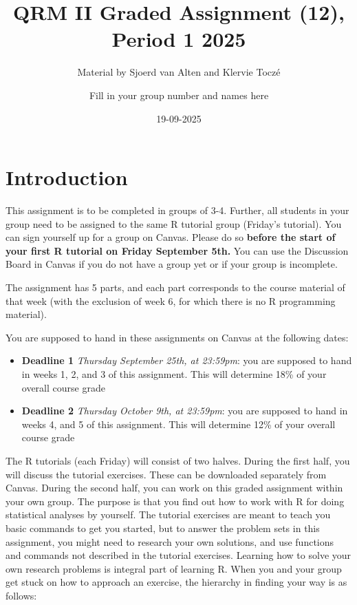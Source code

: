 \documentclass[
]{article}
\title{QRM II Graded Assignment (12), Period 1 2025}
\subtitle{Material by Sjoerd van Alten and Klervie Toczé}
\author{Fill in your group number and names here}
\date{19-09-2025}
\providecommand{\tightlist}{%
  \setlength{\itemsep}{0pt}\setlength{\parskip}{0pt}}
\begin{document}
\maketitle

\section{Introduction}\label{introduction}

This assignment is to be completed in groups of 3-4. Further, all
students in your group need to be assigned to the same R tutorial group
(Friday's tutorial). You can sign yourself up for a group on Canvas.
Please do so
\textbf{before the start of your first R tutorial on Friday September 5th.}
You can use the Discussion Board in Canvas if you do not have a group
yet or if your group is incomplete.

The assignment has 5 parts, and each part corresponds to the course
material of that week (with the exclusion of week 6, for which there is
no R programming material).

You are supposed to hand in these assignments on Canvas at the following
dates:

\begin{itemize}
\tightlist
\item
  \textbf{Deadline 1} \emph{Thursday September 25th, at 23:59pm}: you
  are supposed to hand in weeks 1, 2, and 3 of this assignment. This
  will determine 18\% of your overall course grade
\item
  \textbf{Deadline 2} \emph{Thursday October 9th, at 23:59pm}: you are
  supposed to hand in weeks 4, and 5 of this assignment. This will
  determine 12\% of your overall course grade
\end{itemize}

The R tutorials (each Friday) will consist of two halves. During the
first half, you will discuss the tutorial exercises. These can be
downloaded separately from Canvas. During the second half, you can work
on this graded assignment within your own group. The purpose is that you
find out how to work with R for doing statistical analyses by yourself.
The tutorial exercises are meant to teach you basic commands to get you
started, but to answer the problem sets in this assignment, you might
need to research your own solutions, and use functions and commands not
described in the tutorial exercises. Learning how to solve your own
research problems is integral part of learning R. When you and your
group get stuck on how to approach an exercise, the hierarchy in finding
your way is as follows:
\end{document}
